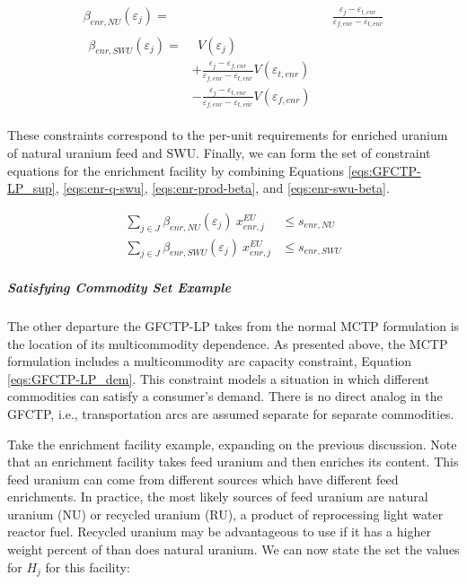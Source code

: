 \begin{align}
\label{eqs:enr-prod-beta}
\beta_{enr,NU}(\varepsilon_{j}) = & \:\: \frac{\varepsilon_{j} - \varepsilon_{t,enr}}
                                      {\varepsilon_{f,enr} - \varepsilon_{t,enr}} \\
\begin{split}
\label{eqs:enr-swu-beta}
\beta_{enr,SWU}(\varepsilon_{j}) = & \:\: V(\varepsilon_{j}) \\
                         & + \frac{\varepsilon_{j} - \varepsilon_{f,enr}}
                                  {\varepsilon_{f,enr} - \varepsilon_{t,enr}} V(\varepsilon_{t,enr}) \\
                         & - \frac{\varepsilon_{j} - \varepsilon_{t,enr}}
                                  {\varepsilon_{f,enr} - \varepsilon_{t,enr}} V(\varepsilon_{f,enr})
\end{split}
\end{align}

These constraints correspond to the per-unit requirements for enriched uranium
of natural uranium feed and SWU. Finally, we can form the set of constraint
equations for the enrichment facility by combining
Equations \ref{eqs:GFCTP-LP_sup}, \ref{eqs:enr-q-swu},
\ref{eqs:enr-prod-beta}, and \ref{eqs:enr-swu-beta}.

\begin{align}
\label{eqs:enr-prod-constr}
\sum_{j \in J}\beta_{enr,NU}(\varepsilon_{j}) \: x_{enr,j}^{EU}  & \leq s_{enr,NU} \\
\label{eqs:enr-swu-constr}
\sum_{j \in J}\beta_{enr,SWU}(\varepsilon_{j}) \: x_{enr,j}^{EU} & \leq s_{enr,SWU}
\end{align}

\subparagraph{Satisfying Commodity Set Example}

The other departure the GFCTP-LP takes from the normal MCTP formulation is the
location of its multicommodity dependence. As presented above, the
MCTP formulation includes a multicommodity arc capacity constraint, Equation
\ref{eqs:GFCTP-LP_dem}. This constraint models a
situation in which different commodities can satisfy a consumer's demand. There
is no direct analog in the GFCTP, i.e., transportation arcs are assumed separate
for separate commodities.

Take the enrichment facility example, expanding on the previous discussion. Note
that an enrichment facility takes feed uranium and then enriches its 
content. This feed uranium can come from different sources which have different
feed enrichments. In practice, the most likely sources of feed uranium are
natural uranium (NU) or recycled uranium (RU), a product of reprocessing light
water reactor fuel. Recycled uranium may be advantageous to use if it has a
higher weight percent of  than does natural uranium. We can now state the
set the values for $H_{j}$ for this facility:

